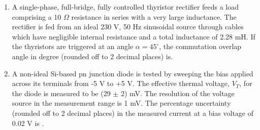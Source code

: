 \documentclass[journal,12pt,onecolumn]{IEEEtran}
\theoremstyle{remark}
\begin{document}
\begin{enumerate}
    \item A single-phase, full-bridge, fully controlled thyristor rectifier feeds a load comprising a 10 $\Omega$ resistance in series with a very large inductance. The rectifier is fed from an ideal 230 V, 50 Hz sinusoidal source through cables which have negligible internal resistance and a total inductance of 2.28 mH. If the thyristors are triggered at an angle $\alpha = 45^\circ$, the commutation overlap angle in degree (rounded off to 2 decimal places) is{\underline{\hspace{2cm}}}.
   

    \item A non-ideal Si-based pn junction diode is tested by sweeping the bias applied across its terminals from -5 V to +5 V. The effective thermal voltage, $V_T$, for the diode is measured to be (29 $\pm$ 2) mV. The resolution of the voltage source in the measurement range is 1 mV. The percentage uncertainty (rounded off to 2 decimal places) in the measured current at a bias voltage of 0.02 V is {\underline{\hspace{2cm}}}.
   

\end{enumerate}
\end{document}

